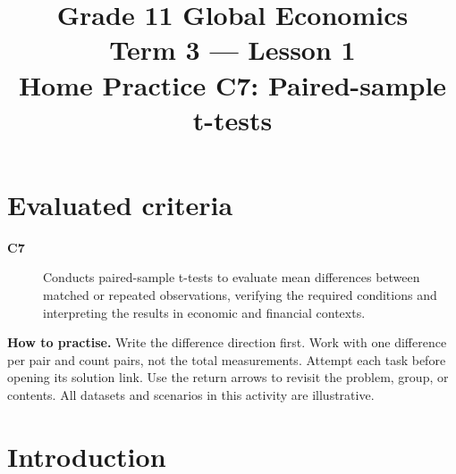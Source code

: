 \makeatletter
{}
\makeatother


\newcommand{\Pop}[1]{\HighlightStroke{GTenHLParameter}{#1}}
\newcommand{\Obs}[1]{\HighlightStroke{GTenHLValue}{#1}}
\newcommand{\Design}[1]{\HighlightStroke{GTenHLThird}{#1}}
\newcommand{\Result}[1]{\HighlightStroke{GTenHLOutcome}{#1}}

\title{Grade 11 Global Economics\\Term 3 --- Lesson 1\\Home Practice C7: Paired-sample t-tests}
\author{}\date{}

\maketitle
\setcounter{tocdepth}{1}
\setcounter{secnumdepth}{2}
\label{toc}
\tableofcontents
\section*{Evaluated criteria}
\begin{description}
\item[\textbf{C7}] Conducts paired-sample t-tests to evaluate mean differences between matched or repeated observations, verifying the required conditions and interpreting the results in economic and financial contexts.
\end{description}
\textbf{How to practise.} Write the difference direction first. Work with one difference per pair and count pairs, not the total measurements. Attempt each task before opening its solution link. Use the return arrows to revisit the problem, group, or contents. All datasets and scenarios in this activity are illustrative.
\clearpage
\section{Introduction}\label{sec:introduction}
